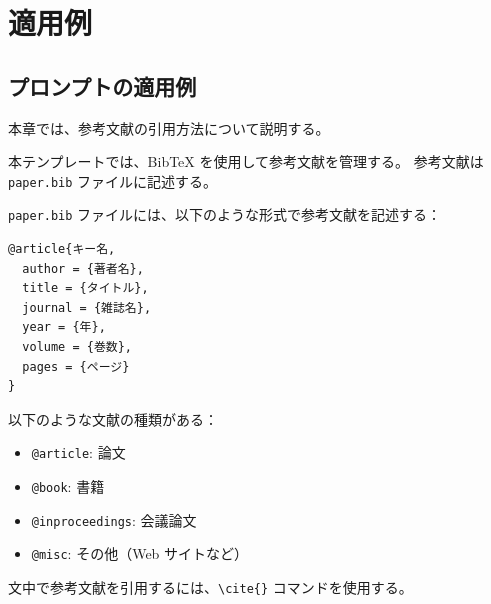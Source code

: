 \chapter{適用例}\label{cha:Indication}

\section{プロンプトの適用例}

\iffalse
本章では、参考文献の引用方法について説明する。


本テンプレートでは、BibTeX を使用して参考文献を管理する。
参考文献は \verb|paper.bib| ファイルに記述する。


\verb|paper.bib| ファイルには、以下のような形式で参考文献を記述する：

\begin{verbatim}
@article{キー名,
  author = {著者名},
  title = {タイトル},
  journal = {雑誌名},
  year = {年},
  volume = {巻数},
  pages = {ページ}
}
\end{verbatim}


以下のような文献の種類がある：

\begin{itemize}
  \item \verb|@article|: 論文
  \item \verb|@book|: 書籍
  \item \verb|@inproceedings|: 会議論文
  \item \verb|@misc|: その他（Web サイトなど）
\end{itemize}


文中で参考文献を引用するには、\verb|\cite{}| コマンドを使用する。

